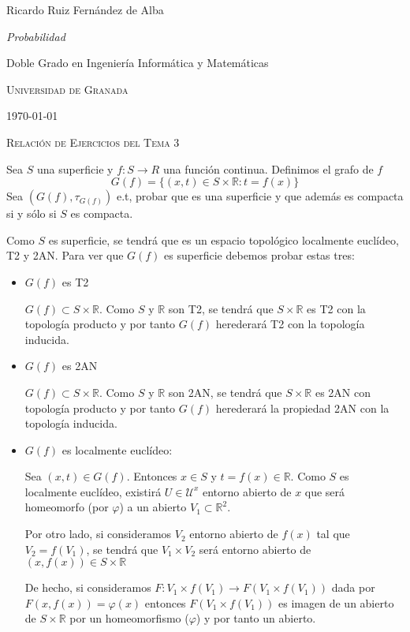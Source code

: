 \documentclass[
  a4paper,
  spanish,
  12pt,
]{scrartcl}
\begin{document}
\begin{flushright}
  Ricardo Ruiz Fernández de Alba\vspace{.5em}

  \textit{Probabilidad}

  Doble Grado en Ingeniería Informática y Matemáticas

  \textsc{Universidad de Granada}\vspace{.5em}

  \today\vspace{.5em}
\end{flushright}

\begin{flushleft}
  \scshape\Large Relación de Ejercicios del Tema 3
\end{flushleft}


\begin{ejer}
	Sea $S$ una superficie y $f: S \rightarrow R$ una función continua. Definimos el grafo de $f$ 
	$$
	G(f) = \{ (x,t) \in S \times \mathbb{R}: t = f(x) \}
	$$
Sea $(G(f), \tau_{G(f)})$ e.t, probar que es una superficie y que además es compacta si y sólo si $S$ es compacta.
\end{ejer}

\begin{sol}
Como $S$ es superficie, se tendrá que es un espacio topológico localmente euclídeo, T2 y 2AN.
Para ver que $G(f)$ es superficie debemos probar estas tres:
\begin{itemize}
    \item{$G(f)$ es T2}
    
    $G(f) \subset S \times \mathbb{R}$. Como $S$ y $\mathbb{R}$ son T2, se tendrá que $S \times \mathbb{R}$ es T2 con la topología producto y por tanto $G(f)$ herederará T2 con la topología inducida.
    
    \item{$G(f)$ es 2AN}
    
    $G(f) \subset S \times \mathbb{R}$. Como $S$ y $\mathbb{R}$ son 2AN, se tendrá que $S \times \mathbb{R}$ es 2AN con topología producto y por tanto $G(f)$ herederará la propiedad 2AN con la topología inducida.
    
    \item{$G(f)$ es localmente euclídeo}:
    
    Sea $(x,t) \in G(f)$. Entonces $x \in S$ y $t = f(x) \in \mathbb{R}$. Como $S$ es localmente euclídeo, existirá $U \in \mathcal{U}^x$ entorno abierto de $x$ que será homeomorfo (por $\varphi$) a un abierto $V_1\subset \mathbb{R}^2$.
    
    Por otro lado, si consideramos $V_2$ entorno abierto de $f(x)$ tal que $V_2=f(V_1)$, se tendrá que $V_1 \times V_2$ será entorno abierto de $(x,f(x)) \in S \times \mathbb{R}$
    
    De hecho, si consideramos $F: V_1 \times f(V_1) \rightarrow F(V_1 \times f(V_1))$
    dada por $F(x,f(x)) = \varphi(x)$ entonces $F(V_1 \times f(V_1))$ es imagen de un abierto de $S \times \mathbb{R}$ por un homeomorfismo ($\varphi$) y por tanto un abierto.
    
    
\end{itemize}

\end{sol}
\end{document}
